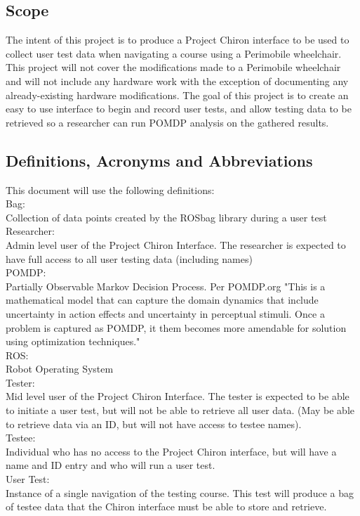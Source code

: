 \documentclass[onecolumn, draftclsnofoot,10pt, compsoc]{IEEEtran}
\begin{document}
\subsection{Scope}
The intent of this project is to produce a Project Chiron interface to be used to collect user test data when navigating a course using a Perimobile wheelchair. This project will not cover the modifications made to a Perimobile wheelchair and will not include any hardware work with the exception of documenting any already-existing hardware modifications. The goal of this project is to create an easy to use interface to begin and record user tests, and allow testing data to be retrieved so a researcher can run POMDP analysis on the gathered results.
\subsection{Definitions, Acronyms and Abbreviations}
This document will use the following definitions:\\
Bag:\\ Collection of data points created by the ROSbag library during a user test\\
Researcher:\\ Admin level user of the Project Chiron Interface. The researcher is expected to have full access to all user testing data (including names)\\
POMDP:\\ Partially Observable Markov Decision Process. Per POMDP.org "This is a mathematical model that can capture the domain dynamics that include uncertainty in action effects and uncertainty in perceptual stimuli. Once a problem is captured as POMDP, it them becomes more amendable for solution using optimization techniques." \cite{1}\\
ROS:\\ Robot Operating System\\
Tester:\\ Mid level user of the Project Chiron Interface. The tester is expected to be able to initiate a user test, but will not be able to retrieve all user data. (May be able to retrieve data via an ID, but will not have access to testee names).\\
Testee:\\ Individual who has no access to the Project Chiron interface, but will have a name and ID entry and who will run a user test.\\
User Test:\\ Instance of a single navigation of the testing course. This test will produce a bag of testee data that the Chiron interface must be able to store and retrieve.\\
\end{document}
